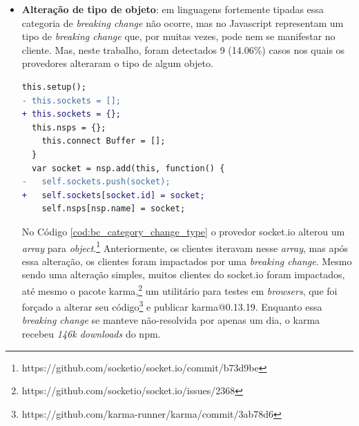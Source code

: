 \begin{itemize}
    \begin{lstlisting}[numbers=none, language=diff, label=cod:bc_category_incompatibles_providers, caption={Exemplo da categoria \textit{Provedores incompatíveis}}]
  }
-   },
-   visitClass: {
+ }, {
+   key: 'visitClass',
        value: function visitClass(node) {
    \end{lstlisting}

    A \textit{release} \textsf{escope@3.4} realizou uma alteração no seu código, de acordo com o Código \ref{cod:bc_category_incompatibles_providers}, mas que não reflete em um erro. Essa alteração impactou diretamente o pacote \textsf{babel-eslint}, mesmo o pacote \textsf{escope} não sendo um provedor direto do \textsf{babel-eslint} e não ter introduzido um erro.\footnote{https://github.com/estools/escope/issues/99\#issuecomment-178151491} Com isso, há uma incompatibilidade entre os provedores e essa incompatibilidade precisou ser corrigida pelo \textsf{babel-eslint}. Essa \textit{breaking change} manteve-se não-consertada por apenas um dia, mas durante esse período o \textsf{babel-eslint} foi descarregado \textit{80k} vezes do \textsf{npm}.

    \item \textbf{Alteração de tipo de objeto}: em linguagens fortemente tipadas essa categoria de \textit{breaking change} não ocorre, mas no \textsf{Javascript} representam um tipo de \textit{breaking change} que, por muitas vezes, pode nem se manifestar no cliente. Mas, neste trabalho, foram detectados 9 (14.06\%) casos nos quais os provedores alteraram o tipo de algum objeto.

    \begin{lstlisting}[numbers=none, language=diff, label=cod:bc_category_change_type, caption={Exemplo da categoria \textit{Alteração de tipo de objeto}}]
  this.setup();
- this.sockets = [];
+ this.sockets = {};
  this.nsps = {};
    this.connect Buffer = [];
  }
  var socket = nsp.add(this, function() {
-   self.sockets.push(socket);
+   self.sockets[socket.id] = socket;
    self.nsps[nsp.name] = socket;
    \end{lstlisting}

    No Código \ref{cod:bc_category_change_type} o provedor \textsf{socket.io} alterou um \textit{array} para \textit{object}.\footnote{https://github.com/socketio/socket.io/commit/b73d9be} Anteriormente, os clientes iteravam nesse \textit{array}, mas após essa alteração, os clientes foram impactados por uma \textit{breaking change}. Mesmo sendo uma alteração simples, muitos clientes do \textsf{socket.io} foram impactados, até mesmo o pacote \textsf{karma},\footnote{https://github.com/socketio/socket.io/issues/2368} um utilitário para testes em \textit{browsers}, que foi forçado a alterar seu código\footnote{https://github.com/karma-runner/karma/commit/3ab78d6} e publicar \textsf{karma@0.13.19}. Enquanto essa \textit{breaking change} se manteve não-resolvida por apenas um dia, o \textsf{karma} recebeu \textit{146k downloads} do \textsf{npm}.


\end{itemize}
